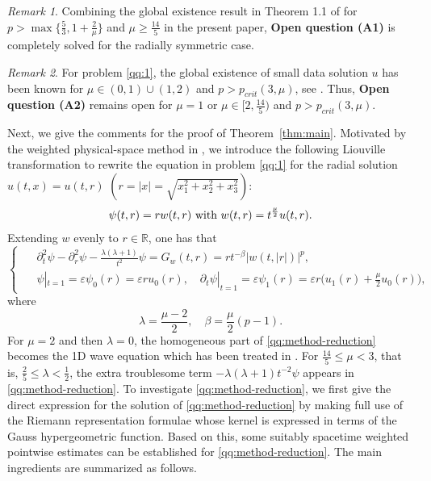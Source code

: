 \documentclass[11pt,twoside]{article}
\newcommand{\R}{\mathbb R}
\newcommand{\p}{\partial}
\newcommand{\ve}{\varepsilon}
\newcommand{\f}{\frac}
\theoremstyle{plain}
\theoremstyle{definition}
\theoremstyle{remark}
\newtheorem{remark}{Remark}[section]
\numberwithin{equation}{section}
\begin{document}
\begin{remark}\label{re1}
Combining the global existence result in Theorem 1.1 of \cite{LY-2} for
$p>\max\{\f{5}{3},1+\f{2}{\mu}\}$ and $\mu\geq\f{14}{5}$
in the present paper,
{\bf Open question (A1)} is completely solved for the radially symmetric case.
\end{remark}

\begin{remark}\label{re-2}
For problem \eqref{qq:1}, the global existence of small data solution $u$
has been known for $\mu\in(0,1)\cup(1,2)$ and $p>p_{crit}(3,\mu)$, see
\cite[Remark~1.14]{HLY}. Thus,
{\bf Open question (A2)} remains open  for $\mu=1$ or
$\mu\in[2,\f{14}{5})$ and $p>p_{crit}(3,\mu)$.
\end{remark}

Next, we give the comments for the proof of Theorem~\ref{thm:main}.
Motivated by the weighted physical-space method in \cite{Asakura1986,Rei1}, we introduce
the following Liouville transformation to rewrite the equation in problem \eqref{qq:1} for the radial solution $u(t,x)=u(t,r)$ $(r=|x|
=\sqrt{x_1^2+x_2^2+x_3^2})$:
\begin{equation}\label{YHC-04}
\begin{aligned}
\text{$\psi(t,r)=rw(t,r)$ with $ w(t,r)=t^{\f{\mu}{2}}u(t,r)$.}
\end{aligned}
\end{equation}
Extending $w$ evenly to $r\in\R$, one has that
\begin{equation}
\label{qq:method-reduction}
\left\{ \enspace
\begin{aligned}
&\p_t^2\psi-\p_r^2\psi-\f{\lambda(\lambda+1)}{t^2}\psi=G_w(t,r)=rt^{-\beta}|w(t,|r|)|^p,\\
&\psi|_{t=1}=\ve\psi_0(r)=\ve ru_0(r), \quad \p_t\psi|_{t=1}=\ve\psi_1(r)=\ve r\big(u_1(r)+\f{\mu}{2}u_0(r)\big),
\end{aligned}
\right.
\end{equation}
where
\begin{equation}\label{qq:method-reduction'}
\lambda=\f{\mu-2}{2},\quad \beta=\f{\mu}{2}(p-1).
\end{equation}
For $\mu=2$ and then $\lambda=0$, the homogeneous part of
\eqref{qq:method-reduction} becomes the 1D wave equation
which has been treated in \cite{Rei1}. For
$\f{14}{5}\leq\mu<3$, that is,
$\f{2}{5}\leq\lambda<\f{1}{2}$, the extra troublesome term
$-\lambda(\lambda+1)t^{-2}\psi$ appears in \eqref{qq:method-reduction}.  To investigate
\eqref{qq:method-reduction}, we first give the direct expression for the solution of \eqref{qq:method-reduction}
by making full use of the Riemann representation formulae whose
kernel is  expressed in terms of the Gauss hypergeometric function.
Based on this, some suitably spacetime weighted pointwise estimates can be established for \eqref{qq:method-reduction}.
The main ingredients are summarized as follows.
\end{document}
